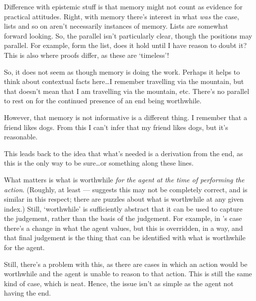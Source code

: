 \documentclass[10pt]{article}
\begin{document}
Difference with epistemic stuff is that memory might not count as evidence for practical attitudes.
Right, with memory there's interest in what \emph{was} the case, lists and so on aren't necessarily instances of memory.
Lists are somewhat forward looking.
So, the parallel isn't particularly clear, though the positions may parallel.
For example, form the list, does it hold until I have reason to doubt it?
This is also where proofs differ, as these are `timeless'!

So, it does not seem as though memory is doing the work.
Perhaps it helps to think about contextual facts here\dots I remember travelling via the mountain, but that doesn't mean that I am travelling via the mountain, etc.
There's no parallel to rest on for the continued presence of an end being worthwhile.

However, that memory is not informative is a different thing.
I remember that a friend likes dogs.
From this I can't infer that my friend likes dogs, but it's reasonable.

This leads back to the idea that what's needed is a derivation from the end, as this is the only way to be sure\dots or something along these lines.

\begin{note}
  What matters is what is worthwhile \emph{for the agent at the time of performing the action}.
  (Roughly, at least --- \citeauthor{Bratman:2007ab} suggests this may not be completely correct, and \citeauthor{Frankfurt:1971aa} is similar in this respect; there are puzzles about what is worthwhile at any given index.)
  Still, `worthwhile' is sufficiently abstract that it can be used to capture the judgement, rather than the basis of the judgement.
  For example, in \citeauthor{Bratman:2007ab}'s case there's a change in what the agent values, but this is overridden, in a way, and that final judgement is the thing that can be identified with what is worthwhile for the agent.

  Still, there's a problem with this, as there are cases in which an action would be worthwhile and the agent is unable to reason to that action.
  This is still the same kind of case, which is neat.
  Hence, the issue isn't as simple as the agent not having the end.
\end{note}

\maketitle
\end{document}
